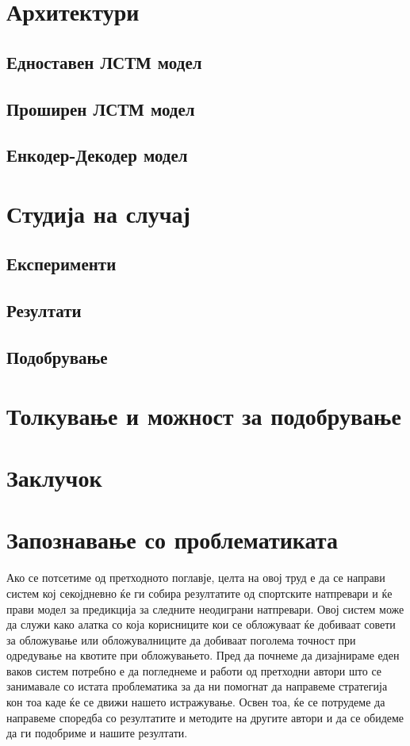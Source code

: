 \chapter{Архитектури}

\section{Едноставен ЛСТМ модел}

\section{Проширен ЛСТМ модел}

\section{Енкодер-Декодер модел}

\chapter{Студија на случај}

\section{Експерименти}

\section{Резултати}

\section{Подобрување}

\chapter{Толкување и можност за подобрување}

\chapter{Заклучок}

\chapter{Запознавање со проблематиката}
\label{sec:literature_Review}
Ако се потсетиме од претходното поглавје, целта на овој труд е да се направи систем кој секојдневно ќе ги собира резултатите од спортските натпревари и ќе прави модел за предикција за следните неодиграни натпревари. Овој систем може да служи како алатка со која корисниците кои се обложуваат ќе добиваат совети за обложување или обложувалниците да добиваат поголема точност при одредување на квотите при обложувањето. Пред да почнеме да дизајнираме еден ваков систем потребно е да погледнеме и работи од претходни автори што се занимавале со истата проблематика за да ни помогнат да направеме стратегија кон тоа каде ќе се движи нашето истражување. Освен тоа, ќе се потрудеме да направеме споредба со резултатите и методите на другите автори и да се обидеме да ги подобриме и нашите резултати.

